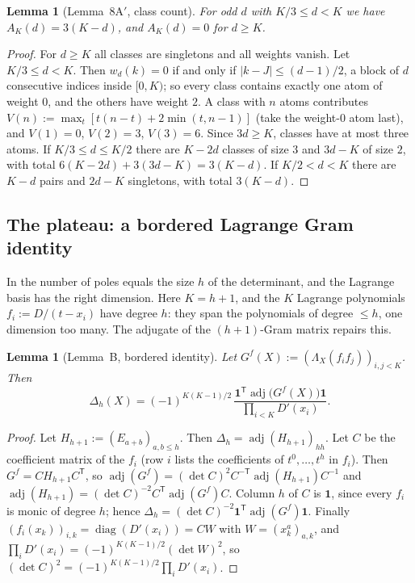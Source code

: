 \documentclass[11pt]{amsart}
\newtheorem{lemma}[theorem]{Lemma}
\theoremstyle{definition}
\theoremstyle{remark}
\numberwithin{equation}{section}
\newcommand{\one}{\mathbf{1}}
\newcommand{\adj}{\operatorname{adj}}
\begin{document}
\begin{lemma}[Lemma~8A$'$, class count]\label{lem:classcount}
For odd $d$ with $K/3\le d<K$ we have $A_K(d)=3(K-d)$, and $A_K(d)=0$ for $d\ge K$.
\end{lemma}

\begin{proof}
For $d\ge K$ all classes are singletons and all weights vanish. Let $K/3\le d<K$. Then $w_d(k)=0$ if and only if
$|k-J|\le(d-1)/2$, a block of $d$ consecutive indices inside $[0,K)$; so every class contains exactly one atom of weight
$0$, and the others have weight $2$. A class with $n$ atoms contributes $V(n):=\max_t[t(n-t)+2\min(t,n-1)]$ (take the
weight-$0$ atom last), and $V(1)=0$, $V(2)=3$, $V(3)=6$. Since $3d\ge K$, classes have at most three atoms. If
$K/3\le d\le K/2$ there are $K-2d$ classes of size $3$ and $3d-K$ of size $2$, with total $6(K-2d)+3(3d-K)=3(K-d)$. If
$K/2<d<K$ there are $K-d$ pairs and $2d-K$ singletons, with total $3(K-d)$.
\end{proof}

\subsection{The plateau: a bordered Lagrange Gram identity}
In \cite{Chi2Paper} the number of poles equals the size $h$ of the determinant, and the Lagrange basis has the right
dimension. Here $K=h+1$, and the $K$ Lagrange polynomials $f_i:=D/(t-x_i)$ have degree $h$: they span the polynomials of
degree $\le h$, one dimension too many. The adjugate of the $(h+1)$-Gram matrix repairs this.

\begin{lemma}[Lemma~B, bordered identity]\label{lem:bordered}
Let $G^f(X):=(\Lambda_X(f_if_j))_{i,j<K}$. Then
\[
  \Delta_h(X)=(-1)^{K(K-1)/2}\,\frac{\one^{\mathsf T}\adj\bigl(G^f(X)\bigr)\one}{\prod_{i<K}D'(x_i)} .
\]
\end{lemma}

\begin{proof}
Let $H_{h+1}:=(E_{a+b})_{a,b\le h}$. Then $\Delta_h=\adj(H_{h+1})_{hh}$. Let $C$ be the coefficient matrix of the
$f_i$ (row $i$ lists the coefficients of $t^0,\dots,t^h$ in $f_i$). Then $G^f=CH_{h+1}C^{\mathsf T}$, so
$\adj(G^f)=(\det C)^2C^{-\mathsf T}\adj(H_{h+1})C^{-1}$ and $\adj(H_{h+1})=(\det C)^{-2}C^{\mathsf T}\adj(G^f)C$. Column $h$
of $C$ is $\one$, since every $f_i$ is monic of degree $h$; hence $\Delta_h=(\det C)^{-2}\one^{\mathsf T}\adj(G^f)\one$.
Finally $(f_i(x_k))_{i,k}=\operatorname{diag}(D'(x_i))=CW$ with $W=(x_k^a)_{a,k}$, and
$\prod_iD'(x_i)=(-1)^{K(K-1)/2}(\det W)^2$, so $(\det C)^2=(-1)^{K(K-1)/2}\prod_iD'(x_i)$.
\end{proof}
\end{document}
